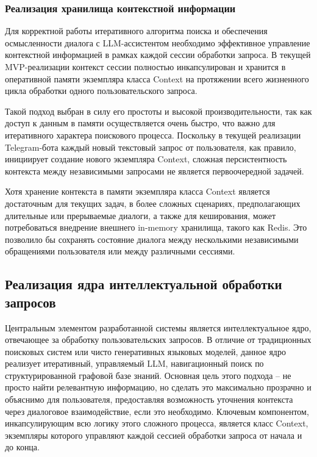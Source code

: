 \subsubsection{Реализация хранилища контекстной информации}

Для корректной работы итеративного алгоритма поиска и обеспечения осмысленности диалога с LLM-ассистентом необходимо эффективное управление контекстной информацией в рамках каждой сессии обработки запроса. В текущей MVP-реализации контекст сессии полностью инкапсулирован и хранится в оперативной памяти экземпляра класса Context на протяжении всего жизненного цикла обработки одного пользовательского запроса.

Такой подход выбран в силу его простоты и высокой производительности, так как доступ к данным в памяти осуществляется очень быстро, что важно для итеративного характера поискового процесса. Поскольку в текущей реализации Telegram-бота каждый новый текстовый запрос от пользователя, как правило, инициирует создание нового экземпляра Context, сложная персистентность контекста между независимыми запросами не является первоочередной задачей.

Хотя хранение контекста в памяти экземпляра класса Context является достаточным для текущих задач, в более сложных сценариях, предполагающих длительные или прерываемые диалоги, а также для кеширования, может потребоваться внедрение внешнего in-memory хранилища, такого как Redis. Это позволило бы сохранять состояние диалога между несколькими независимыми обращениями пользователя или между различными сессиями.

\subsection{Реализация ядра интеллектуальной обработки запросов}

Центральным элементом разработанной системы является интеллектуальное ядро, отвечающее за обработку пользовательских запросов. В отличие от традиционных поисковых систем или чисто генеративных языковых моделей, данное ядро реализует итеративный, управляемый LLM, навигационный поиск по структурированной графовой базе знаний. Основная цель этого подхода – не просто найти релевантную информацию, но сделать это максимально прозрачно и объяснимо для пользователя, предоставляя возможность уточнения контекста через диалоговое взаимодействие, если это необходимо. Ключевым компонентом, инкапсулирующим всю логику этого сложного процесса, является класс Context, экземпляры которого управляют каждой сессией обработки запроса от начала и до конца.

